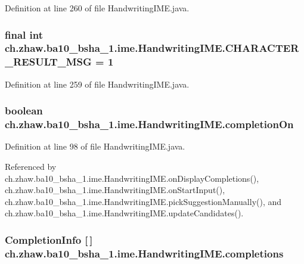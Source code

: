 Definition at line 260 of file HandwritingIME.java.\hypertarget{classch_1_1zhaw_1_1ba10__bsha__1_1_1ime_1_1HandwritingIME_af6448d252df45f5e4ea520c29ec38d0b}{
\subsubsection[{CHARACTER\_\-RESULT\_\-MSG}]{\setlength{\rightskip}{0pt plus 5cm}final int {\bf ch.zhaw.ba10\_\-bsha\_\-1.ime.HandwritingIME.CHARACTER\_\-RESULT\_\-MSG} = 1}}
\label{classch_1_1zhaw_1_1ba10__bsha__1_1_1ime_1_1HandwritingIME_af6448d252df45f5e4ea520c29ec38d0b}


Definition at line 259 of file HandwritingIME.java.\hypertarget{classch_1_1zhaw_1_1ba10__bsha__1_1_1ime_1_1HandwritingIME_ab1ce22088e636ff9cd28e7c5d062471a}{
\subsubsection[{completionOn}]{\setlength{\rightskip}{0pt plus 5cm}boolean {\bf ch.zhaw.ba10\_\-bsha\_\-1.ime.HandwritingIME.completionOn}}}
\label{classch_1_1zhaw_1_1ba10__bsha__1_1_1ime_1_1HandwritingIME_ab1ce22088e636ff9cd28e7c5d062471a}


Definition at line 98 of file HandwritingIME.java.

Referenced by ch.zhaw.ba10\_\-bsha\_\-1.ime.HandwritingIME.onDisplayCompletions(), ch.zhaw.ba10\_\-bsha\_\-1.ime.HandwritingIME.onStartInput(), ch.zhaw.ba10\_\-bsha\_\-1.ime.HandwritingIME.pickSuggestionManually(), and ch.zhaw.ba10\_\-bsha\_\-1.ime.HandwritingIME.updateCandidates().\hypertarget{classch_1_1zhaw_1_1ba10__bsha__1_1_1ime_1_1HandwritingIME_a8df4f47c35084abc7bf31d65b248c5be}{
\subsubsection[{completions}]{\setlength{\rightskip}{0pt plus 5cm}CompletionInfo \mbox{[}$\,$\mbox{]} {\bf ch.zhaw.ba10\_\-bsha\_\-1.ime.HandwritingIME.completions}}}
\label{classch_1_1zhaw_1_1ba10__bsha__1_1_1ime_1_1HandwritingIME_a8df4f47c35084abc7bf31d65b248c5be}


